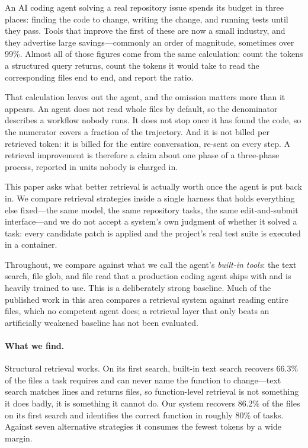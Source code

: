 \documentclass[11pt,letterpaper]{article}
\begin{document}
An AI coding agent solving a real repository issue spends its budget in three
places: finding the code to change, writing the change, and running tests until
they pass. Tools that improve the first of these are now a small industry, and
they advertise large savings---commonly an order of magnitude, sometimes over
99\%. Almost all of those figures come from the same calculation: count the tokens
a structured query returns, count the tokens it would take to read the
corresponding files end to end, and report the ratio.

That calculation leaves out the agent, and the omission matters more than it
appears. An agent does not read whole files by default, so the denominator
describes a workflow nobody runs. It does not stop once it has found the code, so
the numerator covers a fraction of the trajectory. And it is not billed per
retrieved token: it is billed for the entire conversation, re-sent on every step.
A retrieval improvement is therefore a claim about one phase of a three-phase
process, reported in units nobody is charged in.

This paper asks what better retrieval is actually worth once the agent is put
back in. We compare retrieval strategies inside a single harness that holds
everything else fixed---the same model, the same repository tasks, the same
edit-and-submit interface---and we do not accept a system's own judgment of
whether it solved a task: every candidate patch is applied and the project's real
test suite is executed in a container.

Throughout, we compare against what we call the agent's \emph{built-in tools}:
the text search, file glob, and file read that a production coding agent ships
with and is heavily trained to use. This is a deliberately strong baseline. Much
of the published work in this area compares a retrieval system against reading
entire files, which no competent agent does; a retrieval layer that only beats an
artificially weakened baseline has not been evaluated.

\paragraph{What we find.}
Structural retrieval works. On its first search, built-in text search recovers
66.3\% of the files a task requires and can never name the function to
change---text search matches lines and returns files, so function-level retrieval
is not something it does badly, it is something it cannot do. Our system recovers
86.2\% of the files on its first search and identifies the correct function in
roughly 80\% of tasks. Against seven alternative strategies it consumes the fewest
tokens by a wide margin.
\end{document}
